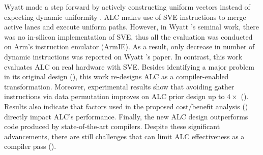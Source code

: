 Wyatt \etal made a step forward by actively constructing uniform vectors instead of expecting dynamic uniformity \cite{praharenka_vectorizing_2022}.
ALC makes use of SVE instructions to merge active lanes and execute uniform paths.
However, in Wyatt \etal's seminal work, there was no in-silicon implementation of SVE, thus all the evaluation was conducted on Arm's instruction emulator (ArmIE).
As a result, only decrease in number of dynamic instructions was reported on Wyatt \etal's paper.
In contrast, this work evaluates ALC on real hardware with SVE.
Besides identifying a major problem in its original design (), this work re-designs ALC as a compiler-enabled transformation.
Moreover, experimental results show that avoiding gather instructions via data permutation improves on ALC prior design up to $4\times$ ().
Results also indicate that factors used in the proposed cost/benefit analysis () directly impact ALC's performance.
Finally, the new ALC design outperforms \ifconverted code produced by state-of-the-art compilers.
Despite these significant advancements, there are still challenges that can limit ALC effectiveness as a compiler pass ().